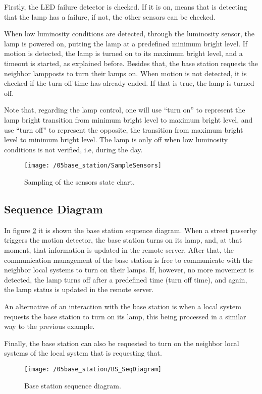 Firstly, the LED failure detector is checked. If it is on, means that is detecting that the lamp has a failure, if not, the other sensors can be checked.

When low luminosity conditions are detected, through the luminosity sensor, the lamp is powered on, putting the lamp at a predefined minimum bright level. If motion is detected, the lamp is turned on to its maximum bright level, and a timeout is started, as explained before. Besides that, the base station requests the neighbor lampposts to turn their lamps on. When motion is not detected, it is checked if the turn off time has already ended. If that is true, the lamp is turned off.

Note that, regarding the lamp control, one will use “turn on” to represent the lamp bright transition from minimum bright level to maximum bright level, and use “turn off” to represent the opposite, the transition from maximum bright level to minimum bright level. The lamp is only off when low luminosity conditions is not verified, i.e, during the day.

\begin{figure}[ht]
	\centering
	\texttt{[image: /05base\_station/SampleSensors]}
	\caption{Sampling of the sensors state chart.}
	\label{fig:sample_sensors}
\end{figure}

\clearpage
\subsection{Sequence Diagram}
In figure \ref{fig:bs_seq_diagram} it is shown the base station sequence diagram. When a street passerby triggers the motion detector, the base station turns on its lamp, and, at that moment, that information is updated in the remote server. After that, the communication management of the base station is free to communicate with the neighbor local systems to turn on their lamps. If, however, no more movement is detected, the lamp turns off after a predefined time (turn off time), and again, the lamp status is updated in the remote server.

An alternative of an interaction with the base station is when a local system requests the base station to turn on its lamp, this being processed in a similar way to the previous example.

Finally, the base station can also be requested to turn on the neighbor local systems of the local system that is requesting that.
\begin{figure}[ht]
	\centering
	\texttt{[image: /05base\_station/BS\_SeqDiagram]}
	\caption{Base station sequence diagram.}
	\label{fig:bs_seq_diagram}
\end{figure}